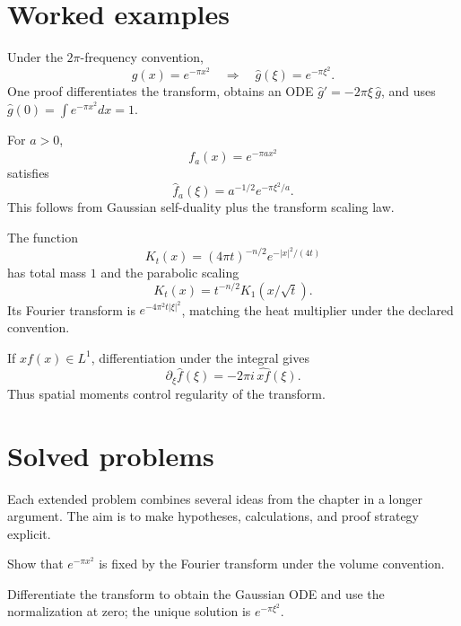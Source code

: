 \section{Worked examples}

\begin{example}\label{ex:iii12-worked-01}
Under the \(2\pi\)-frequency convention,
\[
g(x)=e^{-\pi x^2}
\quad\Longrightarrow\quad
\widehat g(\xi)=e^{-\pi\xi^2}.
\]
One proof differentiates the transform, obtains an ODE
\(\widehat g'=-2\pi\xi\,\widehat g\), and uses
\(\widehat g(0)=\int e^{-\pi x^2}dx=1\).
\end{example}

\begin{example}\label{ex:iii12-worked-02}
For \(a>0\),
\[
f_a(x)=e^{-\pi a x^2}
\]
satisfies
\[
\widehat f_a(\xi)=a^{-1/2}e^{-\pi\xi^2/a}.
\]
This follows from Gaussian self-duality plus the transform scaling law.
\end{example}

\begin{example}\label{ex:iii12-worked-03}
The function
\[
K_t(x)=(4\pi t)^{-n/2}e^{-|x|^2/(4t)}
\]
has total mass \(1\) and the parabolic scaling
\[
K_t(x)=t^{-n/2}K_1(x/\sqrt t).
\]
Its Fourier transform is \(e^{-4\pi^2t|\xi|^2}\), matching the heat multiplier
under the declared convention.
\end{example}

\begin{example}\label{ex:iii12-worked-04}
If \(xf(x)\in L^1\), differentiation under the integral gives
\[
\partial_\xi\widehat f(\xi)
=-2\pi i\,\widehat{xf}(\xi).
\]
Thus spatial moments control regularity of the transform.
\end{example}

\section{Solved problems}
Each extended problem combines several ideas from the chapter in a longer argument. The aim is to make hypotheses, calculations, and proof strategy explicit.

\begin{problem}\label{prob:iii12-problem-01}
Show that \(e^{-\pi x^2}\) is fixed by the Fourier transform under the volume convention.
\end{problem}
\begin{solution}
Differentiate the transform to obtain the Gaussian ODE and use the
normalization at zero; the unique solution is \(e^{-\pi\xi^2}\).
\end{solution}

